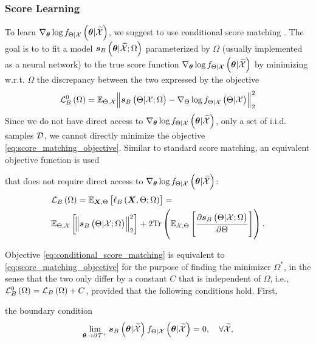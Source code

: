 \subsubsection{Score Learning}\label{sec:score_learning_post}
 To learn $\nabla_{\bm{\theta}}\log f_{\Theta|\mathcal{X}}\left(\bm{\theta}|\widetilde{\mathcal{X}}\right)$, we suggest to use conditional score matching \cite{hyvarinen2005estimation,song2019generative,song2020score}. The goal is to {to fit} a model $\bm{s}_{B}\left(\bm{\theta}|\widetilde{\mathcal{X}}; \Omega\right)$ parameterized by $\Omega$ (usually implemented as a neural network) to %
 the true score function $\nabla_{\bm{\theta}}\log f_{\Theta|\mathcal{X}}\left(\bm{\theta}|\widetilde{\mathcal{X}}\right)$ {by minimizing w.r.t. $\Omega$ the discrepancy between the two expressed by} the objective
\begin{equation}
\label{eq:score_matching_objective}
    \lossbs\brackets{\Omega}=%
    \mathbb{E}_{\pr, \xset} \norm{\postscore{\pr}{\xset;\Omega}-\nabla_{\pr}\log\probt{\pr|\xset}{\pr|\xset}}_2^2
\end{equation}
Since we do not have direct access to $\nabla_{\bm{\theta}}\log f_{\Theta|\mathcal{X}}\left(\bm{\theta}|\widetilde{\mathcal{X}}\right)$, only a set of i.i.d. samples $\mathcal{D}$, we cannot directly minimize the objective %
\eqref{eq:score_matching_objective}. 
Similar %
to standard score matching, an %
equivalent objective function is used {that does not require direct access to $\nabla_{\bm{\theta}}\log f_{\Theta|\mathcal{X}}\left(\bm{\theta}|\widetilde{\mathcal{X}}\right)$:
\begin{align}\label{eq:conditional_score_matching}
&\lossbst\brackets{\Omega}=\expectation{\ell_B\brackets{\X,\pr;\Omega}}{\X,\pr}=\\
&\expectation{\norm{\postscore{\pr}{\xset;\Omega}}_2^2}{\pr,\xset}+2\trace{\expectation{\frac{\partial \postscore{\pr}{\xset;\Omega}}{\partial\pr}}{\xset,\pr}}.\nonumber
\end{align}

Objective \eqref{eq:conditional_score_matching} is equivalent to \eqref{eq:score_matching_objective} for the purpose of finding the minimizer $\Omega^*$,
in the sense that the two only differ by a constant $C$ that is independent of $\Omega$, i.e., ${\mathcal{L}_{B}^{0}}\left(\Omega\right)={{\mathcal{L}}_{B}}\left(\Omega\right)+C$, provided that the following conditions hold.
First,} the boundary condition
\begin{equation}\label{eq:boundary_conditions_post}
    \lim\limits_{\bm{\theta}\rightarrow \partial\mathcal{T}^{+}}\bm{s}_{B}\left(\bm{\theta}|\widetilde{\mathcal{X}}\right)f_{\Theta|\mathcal{X}}\left(\bm{\theta}|\widetilde{\mathcal{X}}\right)=0,\quad\forall\widetilde{\mathcal{X}},
\end{equation}
